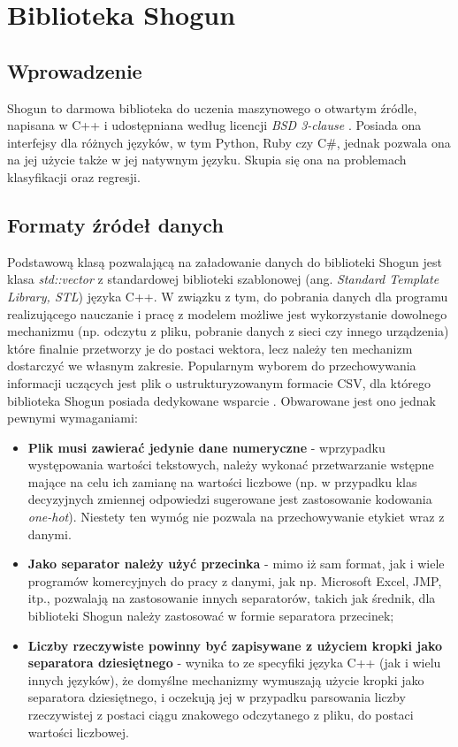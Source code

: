 \chapter{Biblioteka Shogun}

\section{Wprowadzenie}

Shogun to darmowa biblioteka do uczenia maszynowego o otwartym źródle, napisana w C++ i udostępniana według licencji \textit{BSD 3-clause} \cite{shogun:github}. Posiada ona interfejsy dla różnych języków, w tym Python, Ruby czy C\#, jednak pozwala ona na jej użycie także w jej natywnym języku. Skupia się ona na problemach klasyfikacji oraz regresji. 

\section{Formaty źródeł danych}

Podstawową klasą pozwalającą na załadowanie danych do biblioteki Shogun jest klasa \textit{std::vector} z standardowej biblioteki szablonowej (ang. \textit{Standard Template Library, STL}) języka C++. W związku z tym, do pobrania danych dla programu realizującego nauczanie i pracę z modelem możliwe jest wykorzystanie dowolnego mechanizmu (np. odczytu z pliku, pobranie danych z sieci czy innego urządzenia) które finalnie przetworzy je do postaci wektora, lecz należy ten mechanizm dostarczyć we własnym zakresie. Popularnym wyborem do przechowywania informacji uczących jest plik o ustrukturyzowanym formacie CSV, dla którego biblioteka Shogun posiada dedykowane wsparcie \cite{handsOnMachineLearning}. Obwarowane jest ono jednak pewnymi wymaganiami:

\begin{itemize}
	\item \textbf{Plik musi zawierać jedynie dane numeryczne} - wprzypadku występowania wartości tekstowych, należy wykonać przetwarzanie wstępne mające na celu ich zamianę na wartości liczbowe (np. w przypadku klas decyzyjnych zmiennej odpowiedzi sugerowane jest zastosowanie kodowania \textit{one-hot}). Niestety ten wymóg nie pozwala na przechowywanie etykiet wraz z danymi.
	
	\item \textbf{Jako separator należy użyć przecinka} - mimo iż sam format, jak i wiele programów komercyjnych do pracy z danymi, jak np. Microsoft Excel, JMP, itp., pozwalają na zastosowanie innych separatorów, takich jak średnik, dla biblioteki Shogun należy zastosować w formie separatora przecinek;
	
	\item \textbf{Liczby rzeczywiste powinny być zapisywane z użyciem kropki jako separatora dziesiętnego} - wynika to ze specyfiki języka C++ (jak i wielu innych języków), że domyślne mechanizmy wymuszają użycie kropki jako separatora dziesiętnego, i oczekują jej w przypadku parsowania liczby rzeczywistej z postaci ciągu znakowego odczytanego z pliku, do postaci wartości liczbowej.
\end{itemize} 

